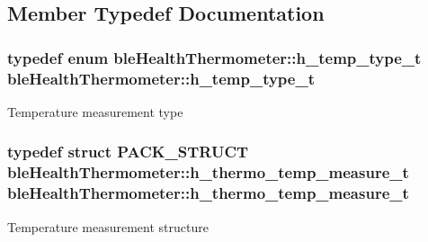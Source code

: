 \subsection{Member Typedef Documentation}
\hypertarget{classble_health_thermometer_a2858081f04462ae92275fd54dc0b52d3}{
\subsubsection[{h\-\_\-temp\-\_\-type\-\_\-t}]{\setlength{\rightskip}{0pt plus 5cm}typedef enum {\bf ble\-Health\-Thermometer\-::h\-\_\-temp\-\_\-type\-\_\-t} {\bf ble\-Health\-Thermometer\-::h\-\_\-temp\-\_\-type\-\_\-t}}}\label{classble_health_thermometer_a2858081f04462ae92275fd54dc0b52d3}
Temperature measurement type \hypertarget{classble_health_thermometer_acf0724e2e0cb746c2c175ec34d226efb}{
\subsubsection[{h\-\_\-thermo\-\_\-temp\-\_\-measure\-\_\-t}]{\setlength{\rightskip}{0pt plus 5cm}typedef struct P\-A\-C\-K\-\_\-\-S\-T\-R\-U\-C\-T {\bf ble\-Health\-Thermometer\-::h\-\_\-thermo\-\_\-temp\-\_\-measure\-\_\-t} {\bf ble\-Health\-Thermometer\-::h\-\_\-thermo\-\_\-temp\-\_\-measure\-\_\-t}}}\label{classble_health_thermometer_acf0724e2e0cb746c2c175ec34d226efb}
Temperature measurement structure 

